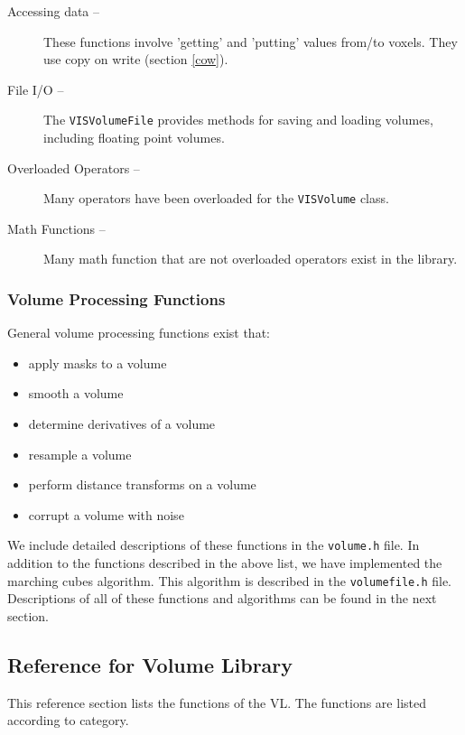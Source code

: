 \begin{description}
\item[Accessing data --]
These functions involve 'getting' and 'putting' values from/to voxels.
They use copy on write (section \ref{cow}).
\item[File I/O --]
The {\tt VISVolumeFile} provides methods for saving and loading volumes,
including floating point volumes.
\item[Overloaded Operators --]
Many operators have been overloaded for the {\tt VISVolume} class.
\item[Math Functions --]
Many math function that are not overloaded operators exist in the library.
\end{description}

\subsubsection{Volume Processing Functions}
General volume processing functions exist that:
\begin{itemize}
\item{apply masks to a volume}
\item{smooth a volume}
\item{determine derivatives of a volume}
\item{resample a volume}
\item{perform distance transforms on a volume}
\item{corrupt a volume with noise}
\end{itemize}
We include detailed descriptions of these functions in the {\tt volume.h} file.
In addition to the functions described in the above list, we have
implemented the marching cubes algorithm.  This algorithm is described in
the {\tt volumefile.h} file.
Descriptions of all of these functions and algorithms can be found in the
next section.

\subsection{Reference for Volume Library}
\label{vref}
This reference section lists the functions of the VL.
The functions are listed according to category.

